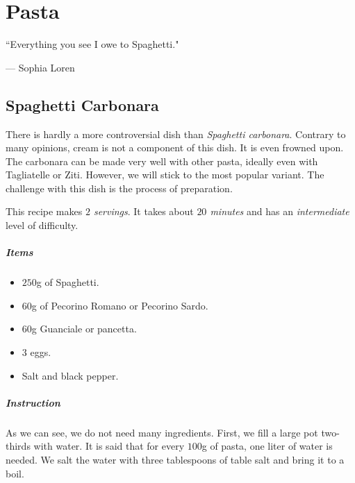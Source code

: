 \chapter{Pasta}
\label{pasta}
\epigraph{``Everything you see I owe to Spaghetti."}{--- \textup{Sophia Loren}}

\section{Spaghetti Carbonara}
\label{Spaghetticarbonara}
There is hardly a more controversial dish than \emph{Spaghetti carbonara}. Contrary to many opinions, cream is not a component of this dish. It is even frowned upon. The carbonara can be made very well with other pasta, ideally even with Tagliatelle or Ziti. However, we will stick to the most popular variant. The challenge with this dish is the process of preparation.

This recipe makes \emph{$2$ servings}. It takes about \emph{$20$ minutes} and has an \emph{intermediate} level of difficulty. 

\paragraph{Items}
\begin{itemize}[noitemsep]
    \item[\ding{182}] $250$g of Spaghetti.
    \item[\ding{183}] $60$g of Pecorino Romano or Pecorino Sardo.
    \item[\ding{184}] $60$g Guanciale or pancetta.
    \item[\ding{185}] $3$ eggs.
    \item[\ding{186}] Salt and black pepper.
\end{itemize}

\paragraph{Instruction} 
As we can see, we do not need many ingredients. First, we fill a large pot two-thirds with water. It is said that for every $100$g of pasta, one liter of water is needed. We salt the water with three tablespoons of table salt and bring it to a boil.

